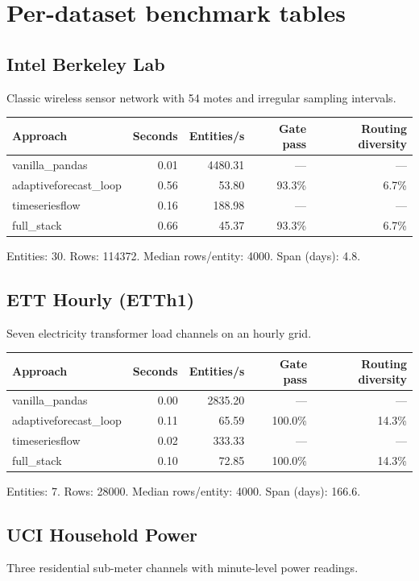 \documentclass[11pt,a4paper]{article}
\begin{document}
\section{Per-dataset benchmark tables}

\subsection{Intel Berkeley Lab}
Classic wireless sensor network with 54 motes and irregular sampling intervals.

\begin{tabular}{lrrrr}
\toprule
Approach & Seconds & Entities/s & Gate pass & Routing diversity \\
\midrule
vanilla\_pandas & 0.01 & 4480.31 & --- & --- \\
adaptiveforecast\_loop & 0.56 & 53.80 & 93.3\% & 6.7\% \\
timeseriesflow & 0.16 & 188.98 & --- & --- \\
full\_stack & 0.66 & 45.37 & 93.3\% & 6.7\% \\
\bottomrule
\end{tabular}

\vspace{0.3cm}
\noindent Entities: 30. Rows: 114372. Median rows/entity: 4000. Span (days): 4.8.

\subsection{ETT Hourly (ETTh1)}
Seven electricity transformer load channels on an hourly grid.

\begin{tabular}{lrrrr}
\toprule
Approach & Seconds & Entities/s & Gate pass & Routing diversity \\
\midrule
vanilla\_pandas & 0.00 & 2835.20 & --- & --- \\
adaptiveforecast\_loop & 0.11 & 65.59 & 100.0\% & 14.3\% \\
timeseriesflow & 0.02 & 333.33 & --- & --- \\
full\_stack & 0.10 & 72.85 & 100.0\% & 14.3\% \\
\bottomrule
\end{tabular}

\vspace{0.3cm}
\noindent Entities: 7. Rows: 28000. Median rows/entity: 4000. Span (days): 166.6.

\subsection{UCI Household Power}
Three residential sub-meter channels with minute-level power readings.
\end{document}
